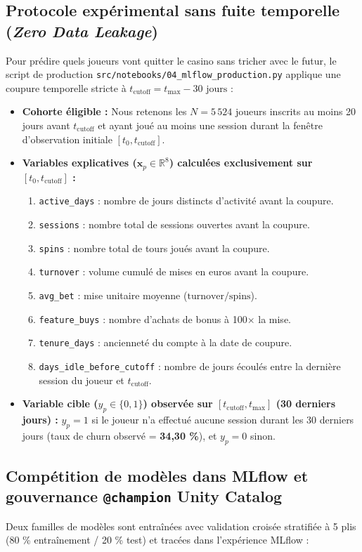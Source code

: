 \documentclass[11pt,a4paper]{article}
\begin{document}
\subsection{Protocole expérimental sans fuite temporelle (\textit{Zero Data Leakage})}
Pour prédire quels joueurs vont quitter le casino sans tricher avec le futur, le script de production \texttt{src/notebooks/04\_mlflow\_production.py} applique une coupure temporelle stricte à $t_{\text{cutoff}} = t_{\max} - 30\text{ jours}$ :
\begin{itemize}
    \item \textbf{Cohorte éligible :} Nous retenons les $N = 5\,524$ joueurs inscrits au moins 20 jours avant $t_{\text{cutoff}}$ et ayant joué au moins une session durant la fenêtre d'observation initiale $[t_0, t_{\text{cutoff}}]$.
    \item \textbf{Variables explicatives ($\mathbf{x}_p \in \mathbb{R}^8$) calculées exclusivement sur $[t_0, t_{\text{cutoff}}]$ :}
    \begin{enumerate}
        \item \texttt{active\_days} : nombre de jours distincts d'activité avant la coupure.
        \item \texttt{sessions} : nombre total de sessions ouvertes avant la coupure.
        \item \texttt{spins} : nombre total de tours joués avant la coupure.
        \item \texttt{turnover} : volume cumulé de mises en euros avant la coupure.
        \item \texttt{avg\_bet} : mise unitaire moyenne ($\text{turnover} / \text{spins}$).
        \item \texttt{feature\_buys} : nombre d'achats de bonus à 100$\times$ la mise.
        \item \texttt{tenure\_days} : ancienneté du compte à la date de coupure.
        \item \texttt{days\_idle\_before\_cutoff} : nombre de jours écoulés entre la dernière session du joueur et $t_{\text{cutoff}}$.
    \end{enumerate}
    \item \textbf{Variable cible ($y_p \in \{0, 1\}$) observée sur $[t_{\text{cutoff}}, t_{\max}]$ (30 derniers jours) :} $y_p = 1$ si le joueur n'a effectué aucune session durant les 30 derniers jours (taux de churn observé = \textbf{34,30 \%}), et $y_p = 0$ sinon.
\end{itemize}

\subsection{Compétition de modèles dans MLflow et gouvernance \texttt{@champion} Unity Catalog}
Deux familles de modèles sont entraînées avec validation croisée stratifiée à 5 plis (80 \% entraînement / 20 \% test) et tracées dans l'expérience MLflow  :
\end{document}

